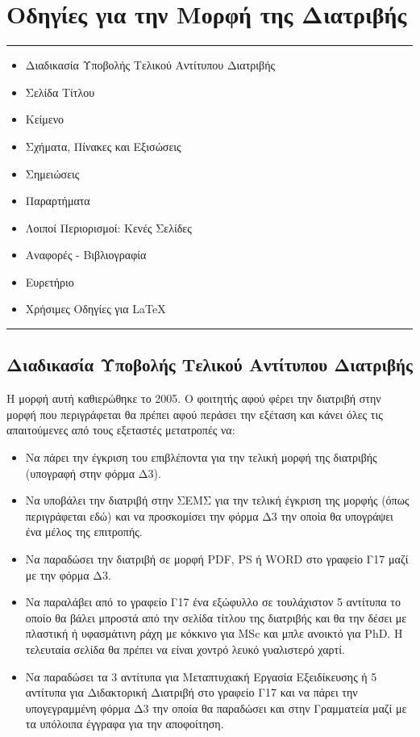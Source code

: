 \chapter{Οδηγίες για την Μορφή της Διατριβής}
\label{ch:QT} \hrule\vspace{0.2in}
\begin{itemize}
  \item[\ref{sec:2.1}] Διαδικασία Υποβολής Τελικού Αντίτυπου Διατριβής
  \item[\ref{sec:2.2}] Σελίδα Τίτλου
  \item[\ref{sec:2.3}] Κείμενο
  \item[\ref{sec:2.4}] Σχήματα, Πίνακες και Εξισώσεις
  \item[\ref{sec:2.5}] Σημειώσεις
  \item[\ref{sec:2.6}] Παραρτήματα
  \item[\ref{sec:2.7}] Λοιποί Περιορισμοί: Κενές Σελίδες
  \item[\ref{sec:2.8}] Αναφορές - Βιβλιογραφία
  \item[\ref{sec:2.9}] Ευρετήριο
  \item[\ref{sec:2.10}] Χρήσιμες Οδηγίες για \LaTeX
\end{itemize}
\hrule \vspace{0.2in}

\section{Διαδικασία Υποβολής Τελικού Αντίτυπου Διατριβής}
\label{sec:2.1}

Η μορφή αυτή καθιερώθηκε το 2005. Ο φοιτητής αφού φέρει την
διατριβή στην μορφή που περιγράφεται θα πρέπει αφού περάσει την
εξέταση και κάνει όλες τις απαιτούμενες από τους εξεταστές
μετατροπές να:

\begin{itemize}
\item Να πάρει την έγκριση του επιβλέποντα για την τελική μορφή της διατριβής (υπογραφή στην φόρμα Δ3).
\item Να υποβάλει την διατριβή στην ΣΕΜΣ για την τελική έγκριση της μορφής (όπως περιγράφεται εδώ) και να προσκομίσει την φόρμα Δ3 την οποία θα υπογράψει ένα μέλος της επιτροπής.
\item Να παραδώσει την διατριβή σε μορφή PDF, PS ή WORD στο γραφείο Γ17 μαζί με την φόρμα Δ3.
\item Να παραλάβει από το γραφείο Γ17 ένα εξώφυλλο σε τουλάχιστον 5 αντίτυπα το οποίο θα βάλει μπροστά από την σελίδα τίτλου της διατριβής και θα την δέσει με πλαστική ή υφασμάτινη ράχη με κόκκινο για MSc και μπλε ανοικτό για PhD. H τελευταία σελίδα θα πρέπει να είναι χοντρό λευκό γυαλιστερό χαρτί.
\item Να παραδώσει τα 3 αντίτυπα για Μεταπτυχιακή Εργασία Εξειδίκευσης ή 5 αντίτυπα για Διδακτορική Διατριβή στο γραφείο Γ17 και να πάρει την υπογεγραμμένη φόρμα Δ3 την οποία θα παραδώσει και στην Γραμματεία μαζί με τα υπόλοιπα έγγραφα για την αποφοίτηση.
\end{itemize}


